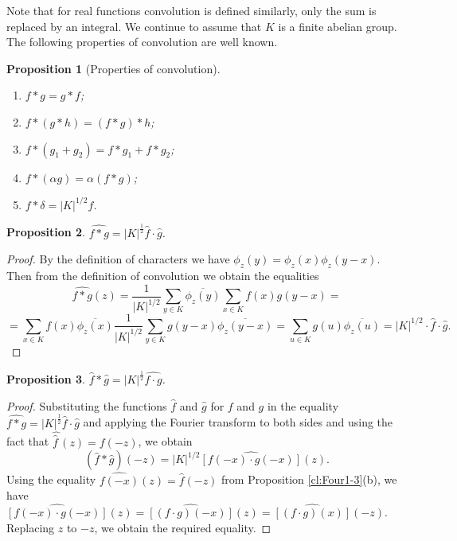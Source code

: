 \documentclass[11pt]{article}
\newtheorem{claim}{Proposition}[section]
\theoremstyle{definition}
\begin{document}
{{{Note that for real functions convolution is defined similarly, only the sum is replaced by an integral.  We continue to assume that $K$ is a finite abelian group. The following properties of convolution are well known.

\begin{claim}[Properties of convolution]\quad \\
\begin{enumerate}
    \item $f*g=g*f$;
    \item $f*(g*h)=(f*g)*h$;
    \item $f*(g_1+g_2)=f*g_1+f*g_2$;
    \item $f*(\alpha g)=\alpha(f*g)$;
    \item $f*\delta=|K|^{1/2} f$.
\end{enumerate}
\end{claim}

\begin{claim}\label{c:convolution}
    $\widehat{f*g}=|K|^{\frac{1}{2}}\widehat{f}\cdot\widehat{g}$.
\end{claim}
\begin{proof}
    By the definition of characters we have $\phi_z(y)=\phi_z(x)\phi_z(y-x)$.
    Then from the definition of convolution we obtain the equalities
    \[
    \widehat{f*g}(z)=
    \frac{1}{|K|^{1/2}}\sum\limits_{y\in K}\overline{\phi_z(y)}
    \sum\limits_{x\in K}f(x)g(y-x)=\]
    \[=\sum\limits_{x\in K}f(x)\overline{\phi_z(x)}\frac{1}{|K|^{1/2}}
    \sum\limits_{y\in K} g(y-x)\overline{\phi_z(y-x)}= \sum\limits_{u\in K} g(u)\overline{\phi_z(u)}=
    |K|^{1/2}\cdot \widehat{f}\cdot\widehat{g}.
    \]
\end{proof}



\begin{claim}\label{c:convolution2}
     $\widehat{f}*\widehat{g}=|K|^{\frac12}\widehat{f\cdot g}$.
\end{claim}
\begin{proof}
Substituting the functions $\widehat{f}$ and $\widehat{g}$ for $f$ and $g$ in the equality
$\widehat{f*g}=|K|^{\frac{1}{2}}\widehat{f}\cdot\widehat{g}$ and applying the Fourier transform to both sides and using the fact that $\widehat{\widehat{f}\,}(z)=f(-z)$, we obtain
    \[
    (\widehat{f}*\widehat{g})(-z)=|K|^{1/2}\widehat{[f(-x)\cdot
    g(-x)]}(z).
    \]
    Using the equality $\widehat{f(-x)}(z)=\widehat{f}(-z)$ from Proposition \ref{cl:Four1-3}(b), we have $\widehat{[f(-x)\cdot g(-x)]}(z)=\widehat{[(f\cdot
    g)(-x)]}(z)=\widehat{[(f\cdot
    g)(x)]}(-z)$. Replacing $z$ to $-z$, we obtain the required equality.
\end{proof}

}}}
\end{document}
